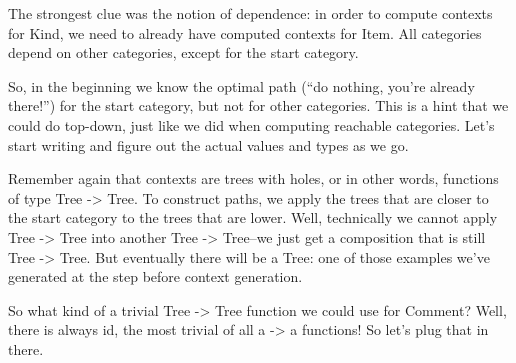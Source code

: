 The strongest clue was the notion of dependence: in order to compute
contexts for Kind, we need to already have computed contexts for
Item. All categories depend on other categories, except for the start
category.

So, in the beginning we know the optimal path (“do nothing, you’re
already there!”) for the start category, but not for other
categories. This is a hint that we could do top-down, just like we did
when computing reachable categories. Let’s start writing and figure
out the actual values and types as we go.

Remember again that contexts are trees with holes, or in other words,
functions of type Tree -> Tree. To construct paths, we apply the trees
that are closer to the start category to the trees that are
lower. Well, technically we cannot apply Tree -> Tree into another Tree
-> Tree–we just get a composition that is still Tree -> Tree. But
eventually there will be a Tree: one of those examples we’ve generated
at the step before context generation.

So what kind of a trivial Tree -> Tree function we could use for
Comment? Well, there is always id, the most trivial of all a -> a
functions! So let’s plug that in there.

\begin{EmptyItem}
\begin{Highlighting}[]
    \OtherTok{::=} 
   \OtherTok{::=} \NormalTok{\{ \}}
   \OtherTok{::=} \NormalTok{\{ \}}
  \OtherTok{::=} \NormalTok{\{ \}}
   \OtherTok{::=} \NormalTok{\{ \}}
  \OtherTok{::=} \NormalTok{\{ \}}
 \OtherTok{::=} \NormalTok{\{ \}}
\end{Highlighting}
\end{EmptyItem}




